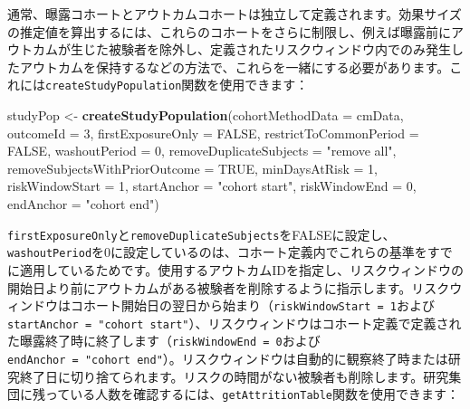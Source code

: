 \documentclass[
  11pt]{book}
\newenvironment{Shaded}{\begin{snugshade}}{\end{snugshade}}
\newcommand{\AttributeTok}[1]{\textcolor[rgb]{0.13,0.29,0.53}{#1}}
\newcommand{\ConstantTok}[1]{\textcolor[rgb]{0.56,0.35,0.01}{#1}}
\newcommand{\DecValTok}[1]{\textcolor[rgb]{0.00,0.00,0.81}{#1}}
\newcommand{\FunctionTok}[1]{\textcolor[rgb]{0.13,0.29,0.53}{\textbf{#1}}}
\newcommand{\NormalTok}[1]{#1}
\newcommand{\OtherTok}[1]{\textcolor[rgb]{0.56,0.35,0.01}{#1}}
\newcommand{\StringTok}[1]{\textcolor[rgb]{0.31,0.60,0.02}{#1}}
\theoremstyle{definition}
\theoremstyle{definition}
\theoremstyle{definition}
\theoremstyle{definition}
\theoremstyle{remark}
\begin{document}
通常、曝露コホートとアウトカムコホートは独立して定義されます。効果サイズの推定値を算出するには、これらのコホートをさらに制限し、例えば曝露前にアウトカムが生じた被験者を除外し、定義されたリスクウィンドウ内でのみ発生したアウトカムを保持するなどの方法で、これらを一緒にする必要があります。これには\texttt{createStudyPopulation}関数を使用できます：

\begin{Shaded}
\begin{Highlighting}[]
\NormalTok{studyPop }\OtherTok{\textless{}{-}} \FunctionTok{createStudyPopulation}\NormalTok{(}\AttributeTok{cohortMethodData =}\NormalTok{ cmData,}
                                  \AttributeTok{outcomeId =} \DecValTok{3}\NormalTok{,}
                                  \AttributeTok{firstExposureOnly =} \ConstantTok{FALSE}\NormalTok{,}
                                  \AttributeTok{restrictToCommonPeriod =} \ConstantTok{FALSE}\NormalTok{,}
                                  \AttributeTok{washoutPeriod =} \DecValTok{0}\NormalTok{,}
                                  \AttributeTok{removeDuplicateSubjects =} \StringTok{"remove all"}\NormalTok{,}
                                  \AttributeTok{removeSubjectsWithPriorOutcome =} \ConstantTok{TRUE}\NormalTok{,}
                                  \AttributeTok{minDaysAtRisk =} \DecValTok{1}\NormalTok{,}
                                  \AttributeTok{riskWindowStart =} \DecValTok{1}\NormalTok{,}
                                  \AttributeTok{startAnchor =} \StringTok{"cohort start"}\NormalTok{,}
                                  \AttributeTok{riskWindowEnd =} \DecValTok{0}\NormalTok{,}
                                  \AttributeTok{endAnchor =} \StringTok{"cohort end"}\NormalTok{)}
\end{Highlighting}
\end{Shaded}

\texttt{firstExposureOnly}と\texttt{removeDuplicateSubjects}をFALSEに設定し、\texttt{washoutPeriod}を0に設定しているのは、コホート定義内でこれらの基準をすでに適用しているためです。使用するアウトカムIDを指定し、リスクウィンドウの開始日より前にアウトカムがある被験者を削除するように指示します。リスクウィンドウはコホート開始日の翌日から始まり（\texttt{riskWindowStart\ =\ 1}および\texttt{startAnchor\ =\ "cohort\ start"}）、リスクウィンドウはコホート定義で定義された曝露終了時に終了します（\texttt{riskWindowEnd\ =\ 0}および\texttt{endAnchor\ =\ "cohort\ end"}）。リスクウィンドウは自動的に観察終了時または研究終了日に切り捨てられます。リスクの時間がない被験者も削除します。研究集団に残っている人数を確認するには、\texttt{getAttritionTable}関数を使用できます：
\end{document}
